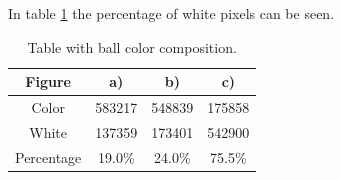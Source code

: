 In table \ref{fig:ballscompotable} the percentage of white pixels can be seen.

\begin{table}[htb]
\centering
\begin{tabular}{|c|c|c|c|}
	\hline Figure & a) & b) & c) \\ 
	\hline Color & 583217 & 548839 & 175858 \\ 
	\hline White & 137359 & 173401 & 542900 \\ 
	\hline Percentage & 19.0\% & 24.0\% & 75.5\% \\ 
	\hline
\end{tabular}
\caption{Table with ball color composition.}
\label{fig:ballscompotable}
\end{table}
